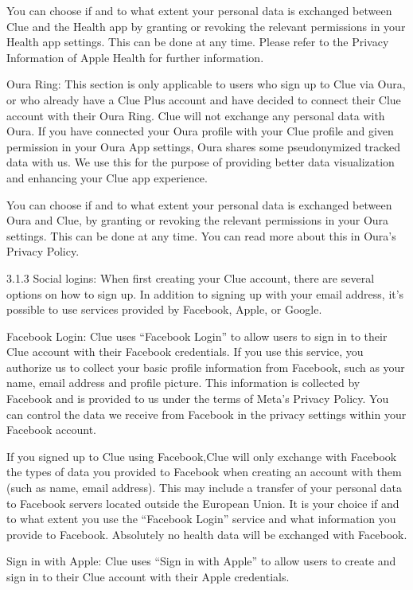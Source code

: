 You can choose if and to what extent your personal data is exchanged between Clue and the Health app by granting or revoking the relevant permissions in your Health app settings. This can be done at any time. Please refer to the Privacy Information of Apple Health for further information.

Oura Ring: This section is only applicable to users who sign up to Clue via Oura, or who already have a Clue Plus account and have decided to connect their Clue account with their Oura Ring. Clue will not exchange any personal data with Oura. If you have connected your Oura profile with your Clue profile and given permission in your Oura App settings, Oura shares some pseudonymized tracked data with us. We use this for the purpose of providing better data visualization and enhancing your Clue app experience.

You can choose if and to what extent your personal data is exchanged between Oura and Clue, by granting or revoking the relevant permissions in your Oura settings. This can be done at any time. You can read more about this in Oura’s Privacy Policy.

3.1.3 Social logins:
When first creating your Clue account, there are several options on how to sign up. In addition to signing up with your email address, it’s possible to use services provided by Facebook, Apple, or Google.

Facebook Login: Clue uses “Facebook Login” to allow users to sign in to their Clue account with their Facebook credentials. If you use this service, you authorize us to collect your basic profile information from Facebook, such as your name, email address and profile picture. This information is collected by Facebook and is provided to us under the terms of Meta’s Privacy Policy. You can control the data we receive from Facebook in the privacy settings within your Facebook account.

If you signed up to Clue using Facebook,Clue will only exchange with Facebook the types of data you provided to Facebook when creating an account with them (such as name, email address). This may include a transfer of your personal data to Facebook servers located outside the European Union. It is your choice if and to what extent you use the “Facebook Login” service and what information you provide to Facebook. Absolutely no health data will be exchanged with Facebook.

Sign in with Apple: Clue uses “Sign in with Apple” to allow users to create and sign in to their Clue account with their Apple credentials.

